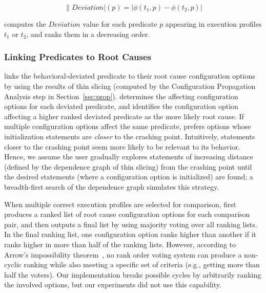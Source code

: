 {\small{
\[
\|Deviation|(p) = |\phi(t_1, p) - \phi(t_2, p)|
\]
}}
\vspace{-4mm}

\ourtool computes the $Deviation$ value for each predicate $p$
appearing in execution profiles $t_1$ or $t_2$, and
ranks them in a decreasing order. 







\subsubsection{Linking Predicates to Root Causes}
\label{sec:linking}


\ourtool links the behavioral-deviated
predicate to their root cause configuration options
by using the results of thin slicing (computed by the Configuration Propagation
Analysis step in Section~\ref{sec:prop}).
\ourtool determines
the affecting configuration options for each deviated predicate,
and identifies the configuration option
affecting a higher ranked deviated predicate as the more likely
root cause. If multiple configuration options affect the same
predicate, \ourtool prefers options whose initialization
statements are \textit{closer} to the
crashing point. Intuitively, statements closer to the
crashing point seem more likely to be relevant to its behavior.
Hence, we assume the user gradually explores statements of
increasing distance (defined by the dependence graph of thin slicing)
from the crashing point until the desired statements (where a configuration
option is initialized) are found; a breadth-first
search of the dependence graph simulates this strategy.


When multiple correct execution profiles are selected for comparison,
\ourtool first produces a ranked list of root cause
configuration options for each comparison pair, and then outputs
a final list by using majority voting over all ranking lists.
In the final ranking list, one configuration option ranks higher
than another if it ranks higher in more than half of the ranking lists.
However, according to Arrow's impossibility theorem~\cite{Fishburn1970103},
no rank order voting system can produce a non-cyclic ranking while also
meeting a specific set of criteria (e.g., getting more than half the voters).
Our implementation breaks possible cycles by arbitrarily ranking the
involved options, but our experiments did not use this capability.



